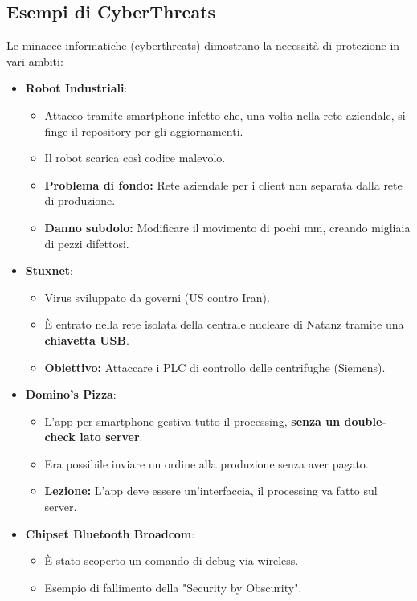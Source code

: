 \documentclass[a4paper,12pt]{article}
\begin{document}
\subsection{Esempi di CyberThreats}
Le minacce informatiche (cyberthreats) dimostrano la necessità di protezione in vari ambiti:
\begin{itemize}
    \item \textbf{Robot Industriali}:
          \begin{itemize}
              \item Attacco tramite smartphone infetto che, una volta nella rete aziendale, si finge il repository per gli aggiornamenti.
              \item Il robot scarica così codice malevolo.
              \item \textbf{Problema di fondo:} Rete aziendale per i client non separata dalla rete di produzione.
              \item \textbf{Danno subdolo:} Modificare il movimento di pochi mm, creando migliaia di pezzi difettosi.
          \end{itemize}

    \item \textbf{Stuxnet}:
          \begin{itemize}
              \item Virus sviluppato da governi (US contro Iran).
              \item È entrato nella rete isolata della centrale nucleare di Natanz tramite una \textbf{chiavetta USB}.
              \item \textbf{Obiettivo:} Attaccare i PLC di controllo delle centrifughe (Siemens).
          \end{itemize}

    \item \textbf{Domino's Pizza}:
          \begin{itemize}
              \item L'app per smartphone gestiva tutto il processing, \textbf{senza un double-check lato server}.
              \item Era possibile inviare un ordine alla produzione senza aver pagato.
              \item \textbf{Lezione:} L'app deve essere un'interfaccia, il processing va fatto sul server.
          \end{itemize}

    \item \textbf{Chipset Bluetooth Broadcom}:
          \begin{itemize}
              \item È stato scoperto un comando di debug via wireless.
              \item Esempio di fallimento della "Security by Obscurity".
          \end{itemize}


\end{itemize}
\end{document}
